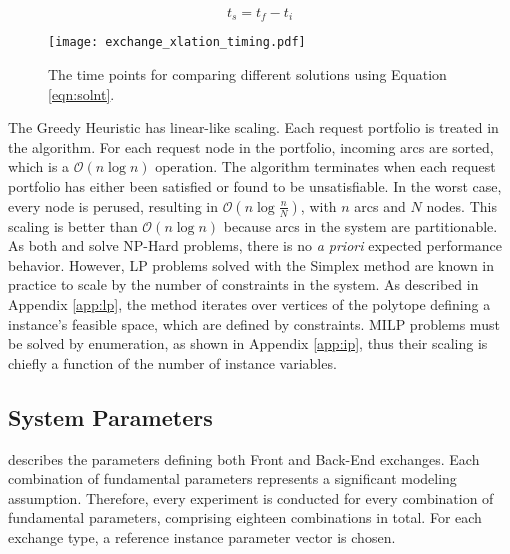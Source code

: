 \begin{equation}\label{eqn:solnt}
t_s = t_f - t_i
\end{equation}

\begin{figure}
  \begin{center}
    \texttt{[image: exchange\_xlation\_timing.pdf]}
    \caption{
      \label{fig:dre_time}
      The time points for comparing different solutions using Equation \ref{eqn:solnt}.}
  \end{center}
\end{figure}

The Greedy Heuristic has linear-like scaling. Each request portfolio is treated
in the algorithm. For each request node in the portfolio, incoming arcs are
sorted, which is a $\mathcal{O}(n\log{}n)$ operation. The algorithm terminates
when each request portfolio has either been satisfied or found to be
unsatisfiable. In the worst case, every node is perused, resulting in
$\mathcal{O}(n\log{}\frac{n}{N})$, with $n$ arcs and $N$ nodes. This scaling is
better than $\mathcal{O}(n\log{}n)$ because arcs in the system are
partitionable. As both \clp and \cbc solve NP-Hard problems, there is no
\textit{a priori} expected performance behavior. However, LP problems solved
with the Simplex method are known in practice to scale by the number of
constraints in the system. As described in Appendix \ref{app:lp}, the method
iterates over vertices of the polytope defining a instance's feasible space,
which are defined by constraints. MILP problems must be solved by enumeration,
as shown in Appendix \ref{app:ip}, thus their scaling is chiefly a function of
the number of instance variables.

\subsection{System Parameters}

 describes the parameters defining both Front
and Back-End exchanges. Each combination of fundamental parameters represents a
significant modeling assumption. Therefore, every experiment is conducted for
every combination of fundamental parameters, comprising eighteen combinations in
total. For each exchange type, a reference instance parameter vector is
chosen. 

